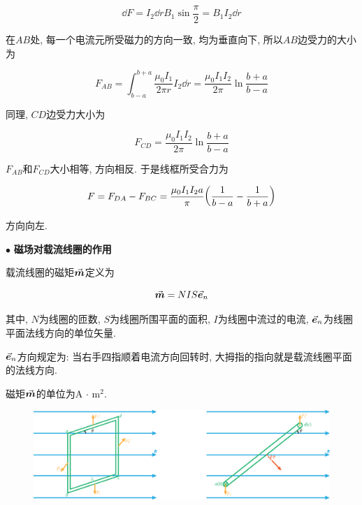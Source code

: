 \begin{example}
\begin{solution}
		\begin{equation*}
			\dd{F} = I_2 \dd{r} B_1 \sin \dfrac{\pi}{2} = B_1 I_2 \dd{r}
		\end{equation*}
		
		在$AB$处, 每一个电流元所受磁力的方向一致, 均为垂直向下, 所以$AB$边受力的大小为
		
		\begin{equation*}
			F_{AB} = \int_{b-a}^{b+a} \dfrac{\mu_0 I_1}{2 \pi r} I_2 \dd{r} = \dfrac{\mu_0 I_1 I_2}{2 \pi} \ln \dfrac{b+a}{b-a}
		\end{equation*}
		
		同理, $CD$边受力大小为
		
		\begin{equation*}
			F_{CD} = \dfrac{\mu_0 I_1 I_2}{2 \pi} \ln \dfrac{b+a}{b-a}
		\end{equation*}
		
		$F_{AB}$和$F_{CD}$大小相等, 方向相反. 于是线框所受合力为
		
		\begin{equation*}
			F = F_{DA} - F_{BC} = \dfrac{\mu_0 I_1 I_2 a}{\pi} \qty(\dfrac{1}{b - a} - \dfrac{1}{b + a})
		\end{equation*}
		
		方向向左. 
		
	\end{solution}
	
\end{example}

$\bullet$ \textbf{磁场对载流线圈的作用}

\begin{definition}[载流线圈的磁矩]
	
	载流线圈的磁矩$\va*{m}$定义为
	
	\begin{equation}
		\va*{m} = NIS\va*{e}_n \label{C8-eq16}
	\end{equation}
	
	其中, $N$为线圈的匝数, $S$为线圈所围平面的面积, $I$为线圈中流过的电流, $\va*{e}_n$为线圈平面法线方向的单位矢量. 
	
	$\va*{e}_n$方向规定为: 当右手四指顺着电流方向回转时, 大拇指的指向就是载流线圈平面的法线方向. 
	
	磁矩$\va*{m}$的单位为A $\cdot$ m$^2$. 
	
\end{definition}

\begin{figure}[H]
	\centering
	\includegraphics[scale=0.8]{C8-fig16.eps}
\end{figure}

